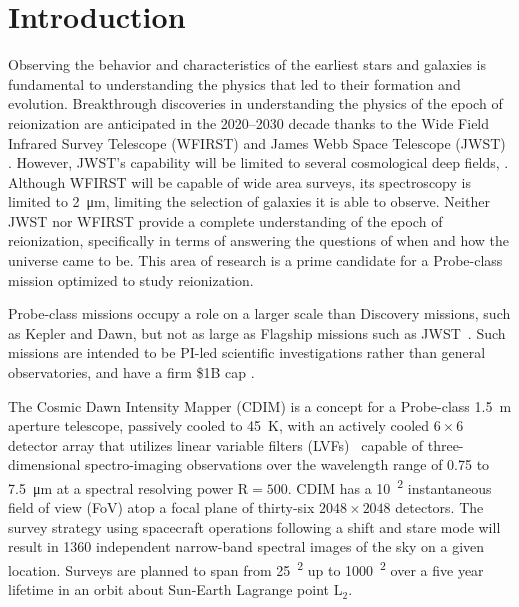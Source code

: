\documentclass{ws-jai}
\begin{document}
\section{Introduction}
\label{sec:introduction}
Observing the behavior and characteristics of the earliest stars and galaxies is fundamental to understanding the physics that led to their formation and evolution.
Breakthrough discoveries in understanding the physics of the epoch of reionization are anticipated in the 2020--2030 decade thanks to the Wide Field Infrared Survey Telescope (WFIRST) \red{[REF]} and James Webb Space Telescope (JWST) \red{[REF]}.
However, JWST's capability will be limited to several cosmological deep fields, .
Although WFIRST will be capable of wide area surveys, its spectroscopy is limited to \SI{2}{\micro\meter}, limiting the selection of galaxies it is able to observe.
Neither JWST nor WFIRST provide a complete understanding of the epoch of reionization, specifically in terms of answering the questions of when and how the universe came to be. \red{[REF?]}
This area of research is a prime candidate for a Probe-class mission optimized to study reionization.


Probe-class missions occupy a role on a larger scale than Discovery missions, such as Kepler and Dawn, but not as large as Flagship missions such as JWST~\cite{probeclasswp}.
Such missions are intended to be PI-led scientific investigations rather than general observatories, and have a firm \$1B cap \red{[REF]}.

The Cosmic Dawn Intensity Mapper (CDIM) is a concept for a Probe-class \SI{1.5}{\meter} aperture telescope, passively cooled to \SI{45}{\kelvin}, with an actively cooled $6\times6$ detector array that utilizes linear variable filters (LVFs)~\cite{cooray2016cdim2page} capable of three-dimensional spectro-imaging observations over the wavelength range of 0.75 to \SI{7.5}{\micro\meter} at a spectral resolving power R$=500$.
CDIM has a \SI{10}{\deg\squared} instantaneous field of view (FoV) atop a focal plane of thirty-six $2048\times2048$ detectors.
The survey strategy using spacecraft operations following a shift and stare mode will result in 1360 independent narrow-band spectral images of the sky on a given location.
Surveys are planned to span from \SI{25}{\deg\squared} up to \SI{1000}{\deg\squared} over a five year lifetime in an orbit about Sun-Earth Lagrange point L$_{2}$\@.
\end{document}
